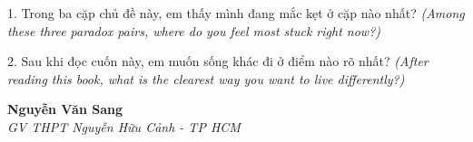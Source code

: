 \begin{tuhocnhanh}
1. Trong ba cặp chủ đề này, em thấy mình đang mắc kẹt ở cặp nào nhất? \textit{(Among these three paradox pairs, where do you feel most stuck right now?)}

2. Sau khi đọc cuốn này, em muốn sống khác đi ở điểm nào rõ nhất? \textit{(After reading this book, what is the clearest way you want to live differently?)}
\end{tuhocnhanh}

\begin{flushright}
\textbf{Nguyễn Văn Sang}\\
\textit{GV THPT Nguyễn Hữu Cảnh - TP HCM}
\end{flushright}

\ngancach